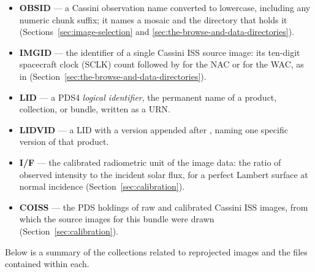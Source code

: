 \begin{itemize}
\item \textbf{OBSID} — a Cassini observation name converted to lowercase, including any numeric chunk suffix; it names a mosaic and the directory that holds it (Sections~\ref{sec:image-selection} and \ref{sec:the-browse-and-data-directories}).
\item \textbf{IMGID} — the identifier of a single Cassini ISS source image: its ten-digit spacecraft clock (SCLK) count followed by  for the NAC or  for the WAC, as in  (Section~\ref{sec:the-browse-and-data-directories}).
\item \textbf{LID} — a PDS4 \textit{logical identifier}, the permanent name of a product, collection, or bundle, written as a  URN.
\item \textbf{LIDVID} — a LID with a version appended after \code{::}, naming one specific version of that product.
\item \textbf{I/F} — the calibrated radiometric unit of the image data: the ratio of observed intensity to the incident solar flux, for a perfect Lambert surface at normal incidence (Section~\ref{sec:calibration}).
\item \textbf{COISS} — the PDS holdings of raw and calibrated Cassini ISS images, from which the source images for this bundle were drawn (Section~\ref{sec:calibration}).
\end{itemize}

Below is a summary of the collections related to reprojected images and the files contained within each.

